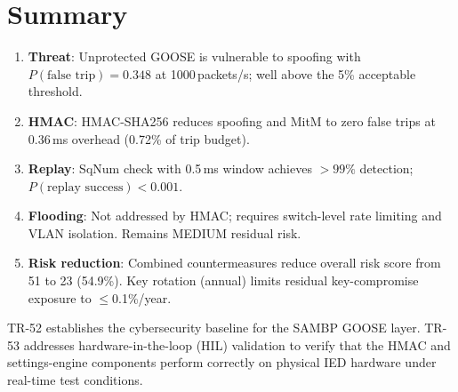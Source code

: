 \documentclass[11pt,a4paper]{article}
\begin{document}
\section{Summary}
\label{sec:summary}

\begin{enumerate}
  \item \textbf{Threat}: Unprotected GOOSE is vulnerable to spoofing
    with $P(\text{false trip})=0.348$ at 1000\,packets/s; well above the
    5\% acceptable threshold.

  \item \textbf{HMAC}: HMAC-SHA256 reduces spoofing and MitM to zero
    false trips at 0.36\,ms overhead (0.72\% of trip budget).

  \item \textbf{Replay}: SqNum check with 0.5\,ms window achieves
    $>99\%$ detection; $P(\text{replay success})<0.001$.

  \item \textbf{Flooding}: Not addressed by HMAC; requires switch-level
    rate limiting and VLAN isolation.  Remains MEDIUM residual risk.

  \item \textbf{Risk reduction}: Combined countermeasures reduce overall
    risk score from 51 to 23 (54.9\%).  Key rotation (annual) limits
    residual key-compromise exposure to $\leq$0.1\%/year.
\end{enumerate}

\noindent
TR-52 establishes the cybersecurity baseline for the SAMBP GOOSE layer.
TR-53 addresses hardware-in-the-loop (HIL) validation to verify that the
HMAC and settings-engine components perform correctly on physical IED
hardware under real-time test conditions.



\end{document}
